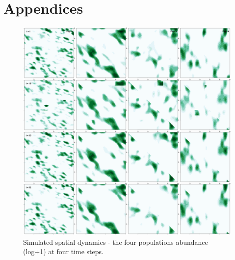 \documentclass[review]{elsarticle}
\begin{document}
\section*{Appendices}



\clearpage
\footnotesize






\clearpage

\begin{figure}[!ht]
	\includegraphics[width = \linewidth]{Plots/pop_dist}
	\caption{Simulated spatial dynamics - the four populations abundance
		(log+1) at four time steps.
		}
	\label{fig:9}
\end{figure}	
\end{document}
